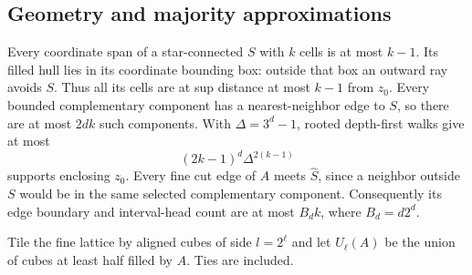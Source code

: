 \documentclass[11pt,a4paper]{article}
\numberwithin{equation}{section}
\begin{document}
\subsection{Geometry and majority approximations}
Every coordinate span of a star-connected $S$ with $k$ cells is at most
$k-1$. Its filled hull lies in its coordinate bounding box: outside that
box an outward ray avoids $S$. Thus all its cells are at sup distance
at most $k-1$ from $z_0$.
Every bounded complementary component has a nearest-neighbor edge to
$S$, so there are at most $2dk$ such components.
With $\Delta=3^d-1$, rooted depth-first walks give at most
\begin{equation}\label{eq:support-count}
 (2k-1)^d\Delta^{2(k-1)}
\end{equation}
supports enclosing $z_0$.
Every fine cut edge of $A$ meets $\widehat S$, since a neighbor outside
$S$ would be in the same selected complementary component.
Consequently its edge boundary and interval-head count are at most
$B_d k$, where $B_d=d2^d$.

Tile the fine lattice by aligned cubes of side $l=2^\ell$ and let
$U_\ell(A)$ be the union of cubes at least half filled by $A$.
Ties are included.
\end{document}
